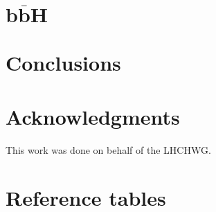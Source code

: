 \documentclass[11pt]{article}
\begin{document}
\section{$\boldsymbol{b\bar{b}H}$}


\section{Conclusions}


\section*{Acknowledgments}
This work was done on behalf of the LHCHWG.
\newpage
\appendix
\section{Reference tables}



\end{document}
